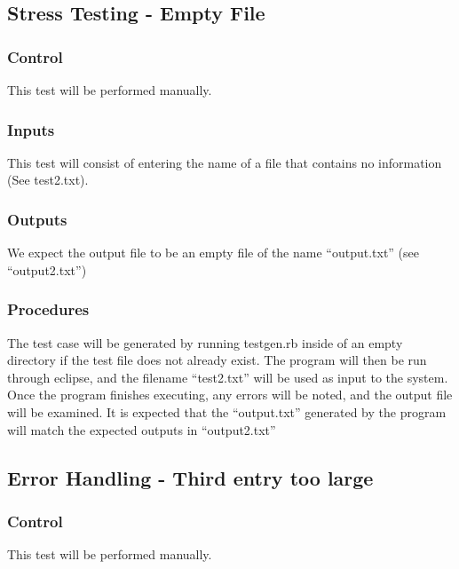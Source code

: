 \documentclass[]{article}
\begin{document}

\subsection{Stress Testing - Empty File}
	\subsubsection{Control}
	This test will be performed manually.
	
	\subsubsection{Inputs}
	This test will consist of entering the name of a file that contains no
	information (See test2.txt).
	
	\subsubsection{Outputs}
	We expect the output file to be an empty file of the name ``output.txt''
	(see ``output2.txt'')
	
	\subsubsection{Procedures}
	The test case will be generated by running testgen.rb inside of an empty
	directory if the test file does not already exist.  The program will then be
	run through eclipse, and the filename ``test2.txt'' will be used as input to
	the system.  Once the program finishes executing, any errors will be noted, and
	the output file will be examined.  It is expected that the ``output.txt''
	generated by the program will match the expected outputs in ``output2.txt'' 
	

\subsection{Error Handling - Third entry too large}
	\subsubsection{Control}
	This test will be performed manually.
	
\end{document}
